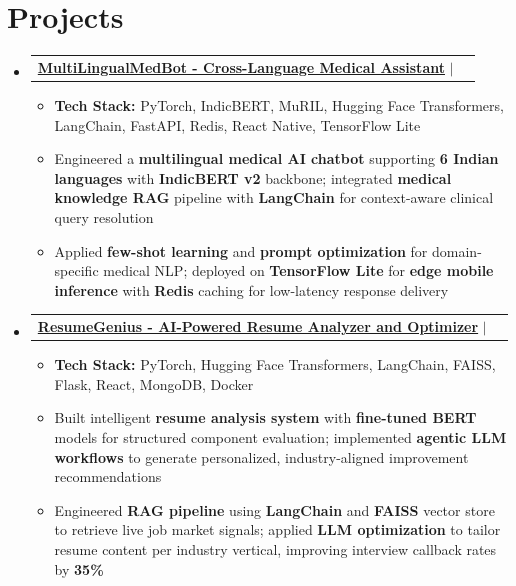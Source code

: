 \documentclass[a4paper, 11pt]{article}
\makeatletter
\newcommand{\resumeItemWithoutTitle}[1]{
  \item\small{
    {#1 \vspace{-2pt}}
      {\vspace{-2pt}}
  }
}
\newcommand{\resumeSubheadingPro}[2]{
  \vspace{-2pt}\item
  \begin{tabular*}{0.97\textwidth}{l@{\extracolsep{\fill}}r}
    #1 & {\textit {\small{#2}}} \\
  \end{tabular*}\vspace{-7pt}
}
\newcommand{\resumeSubHeadingListStart}{\begin{itemize}[leftmargin=*,
      label={}]}
\newcommand{\resumeSubHeadingListEnd}{\end{itemize}}
\newcommand{\resumeItemListStart}{\begin{itemize}}
\newcommand{\resumeItemListEnd}{\end{itemize}\vspace{-2pt}}
\makeatother
\begin{document}
\section{Projects}


\resumeSubHeadingListStart
\resumeSubheadingPro
{\href{https://github.com/AnubhavBhattachayra/MultilingualMedBot}{{\textbf{MultiLingualMedBot - Cross-Language Medical Assistant}}} $|$ 
  \href{https://github.com/AnubhavBhattachayra/MultilingualMedBot}{\faIcon{github}}}{}
\resumeItemListStart
\resumeItemWithoutTitle
{\textbf{Tech Stack:} PyTorch, IndicBERT, MuRIL, Hugging Face Transformers, LangChain, FastAPI, Redis, React Native, TensorFlow Lite}
\resumeItemWithoutTitle
{Engineered a \textbf{multilingual medical AI chatbot} supporting \textbf{6 Indian languages} with \textbf{IndicBERT v2} backbone; integrated \textbf{medical knowledge RAG} pipeline with \textbf{LangChain} for context-aware clinical query resolution}
\resumeItemWithoutTitle
{Applied \textbf{few-shot learning} and \textbf{prompt optimization} for domain-specific medical NLP; deployed on \textbf{TensorFlow Lite} for \textbf{edge mobile inference} with \textbf{Redis} caching for low-latency response delivery}
\resumeItemListEnd
\resumeSubHeadingListEnd

\resumeSubHeadingListStart
\resumeSubheadingPro
{\href{https://github.com/AnubhavBhattachayra/ResumeGenius}{{\textbf{ResumeGenius - AI-Powered Resume Analyzer and Optimizer}}} $|$    
  \href{https://github.com/AnubhavBhattachayra/ResumeGenius}{\faIcon{github}}}{}
\resumeItemListStart
\resumeItemWithoutTitle
{\textbf{Tech Stack:} PyTorch, Hugging Face Transformers, LangChain, FAISS, Flask, React, MongoDB, Docker}
\resumeItemWithoutTitle
{Built intelligent \textbf{resume analysis system} with \textbf{fine-tuned BERT} models for structured component evaluation; implemented \textbf{agentic LLM workflows} to generate personalized, industry-aligned improvement recommendations}
\resumeItemWithoutTitle
{Engineered \textbf{RAG pipeline} using \textbf{LangChain} and \textbf{FAISS} vector store to retrieve live job market signals; applied \textbf{LLM optimization} to tailor resume content per industry vertical, improving interview callback rates by \textbf{35\%}}
\resumeItemListEnd
\resumeSubHeadingListEnd
\end{document}
